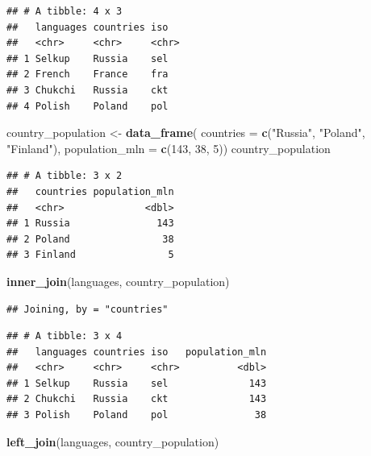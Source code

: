 \documentclass[
]{book}
\newenvironment{Shaded}{\begin{snugshade}}{\end{snugshade}}
\newcommand{\DataTypeTok}[1]{\textcolor[rgb]{0.13,0.29,0.53}{#1}}
\newcommand{\DecValTok}[1]{\textcolor[rgb]{0.00,0.00,0.81}{#1}}
\newcommand{\KeywordTok}[1]{\textcolor[rgb]{0.13,0.29,0.53}{\textbf{#1}}}
\newcommand{\NormalTok}[1]{#1}
\newcommand{\StringTok}[1]{\textcolor[rgb]{0.31,0.60,0.02}{#1}}
\begin{document}
\begin{verbatim}
## # A tibble: 4 x 3
##   languages countries iso  
##   <chr>     <chr>     <chr>
## 1 Selkup    Russia    sel  
## 2 French    France    fra  
## 3 Chukchi   Russia    ckt  
## 4 Polish    Poland    pol
\end{verbatim}

\begin{Shaded}
\begin{Highlighting}[]
\NormalTok{country_population <-}\StringTok{ }\KeywordTok{data_frame}\NormalTok{(}
  \DataTypeTok{countries =} \KeywordTok{c}\NormalTok{(}\StringTok{"Russia"}\NormalTok{, }\StringTok{"Poland"}\NormalTok{, }\StringTok{"Finland"}\NormalTok{),}
  \DataTypeTok{population_mln =} \KeywordTok{c}\NormalTok{(}\DecValTok{143}\NormalTok{, }\DecValTok{38}\NormalTok{, }\DecValTok{5}\NormalTok{))}
\NormalTok{country_population}
\end{Highlighting}
\end{Shaded}

\begin{verbatim}
## # A tibble: 3 x 2
##   countries population_mln
##   <chr>              <dbl>
## 1 Russia               143
## 2 Poland                38
## 3 Finland                5
\end{verbatim}

\begin{Shaded}
\begin{Highlighting}[]
\KeywordTok{inner_join}\NormalTok{(languages, country_population)}
\end{Highlighting}
\end{Shaded}

\begin{verbatim}
## Joining, by = "countries"
\end{verbatim}

\begin{verbatim}
## # A tibble: 3 x 4
##   languages countries iso   population_mln
##   <chr>     <chr>     <chr>          <dbl>
## 1 Selkup    Russia    sel              143
## 2 Chukchi   Russia    ckt              143
## 3 Polish    Poland    pol               38
\end{verbatim}

\begin{Shaded}
\begin{Highlighting}[]
\KeywordTok{left_join}\NormalTok{(languages, country_population)}
\end{Highlighting}
\end{Shaded}
\end{document}
